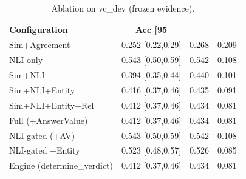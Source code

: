 \begin{table}[t]
\centering
\caption{Ablation on vc_dev (frozen evidence).}
\label{tab:ablation_vc_dev}
\small
\begin{tabular}{lccc}
\hline
Configuration & Acc [95\\%
\hline
Sim+Agreement & 0.252 [0.22,0.29] & 0.268 & 0.209 \\
NLI only & 0.543 [0.50,0.59] & 0.542 & 0.108 \\
Sim+NLI & 0.394 [0.35,0.44] & 0.440 & 0.101 \\
Sim+NLI+Entity & 0.416 [0.37,0.46] & 0.435 & 0.091 \\
Sim+NLI+Entity+Rel & 0.412 [0.37,0.46] & 0.434 & 0.081 \\
Full (+AnswerValue) & 0.412 [0.37,0.46] & 0.434 & 0.081 \\
NLI-gated (+AV) & 0.543 [0.50,0.59] & 0.542 & 0.108 \\
NLI-gated +Entity & 0.523 [0.48,0.57] & 0.526 & 0.085 \\
Engine (determine\_verdict) & 0.412 [0.37,0.46] & 0.434 & 0.081 \\
\hline
\end{tabular}
\end{table}